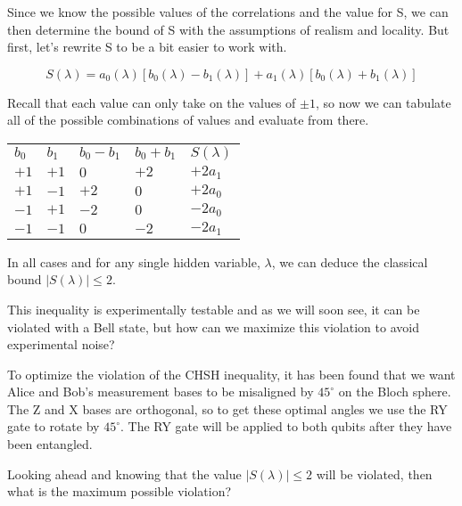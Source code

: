 \documentclass[12pt]{article}
\begin{document}
Since we know the possible values of the correlations and the value for S, we can then determine the bound of S with the assumptions of realism and locality. But first, let's rewrite S to be a bit easier to work with.

$$
S(\lambda)= a_0(\lambda) [b_0(\lambda) - b_1(\lambda)] + a_1(\lambda) [b_0(\lambda) + b_1(\lambda)]
$$

Recall that each value can only take on the values of $\pm1$, so now we can tabulate all of the possible combinations of values and evaluate from there.

\begin{center}
\begin{tabular}{
  |>{\centering\arraybackslash}p{1.5cm}  %
  |>{\centering\arraybackslash}p{1.5cm} 
  |>{\centering\arraybackslash}p{1.5cm} 
  |>{\centering\arraybackslash}p{1.5cm} 
  |>{\centering\arraybackslash}p{1.5cm}| 
}
 \hline
 \multicolumn{5}{|c|}{All possible permutations} \\
 \hline
 \(b_0\) & \(b_1\) & \(b_0 - b_1\) & \(b_0 + b_1\) & \(S(\lambda)\) \\
 \hline
 \(+1\)   &  \(+1\)    & \(0\) &  \(+2\) & \(+2a_1\) \\
 \(+1\)   &  \(-1\)    & \(+2\)&  \(0\) & \(+2a_0\) \\
 \(-1\)   &  \(+1\)    & \(-2\)&  \(0\) & \(-2a_0\) \\
 \(-1\)   &  \(-1\)    & \(0\) &  \(-2\) & \(-2a_1\) \\
 \hline
\end{tabular}
\end{center}

In all cases and for any single hidden variable, $\lambda$, we can deduce the classical bound $|S(\lambda)| \leq 2$. 

This inequality is experimentally testable and as we will soon see, it can be violated with a Bell state, but how can we maximize this violation to avoid experimental noise?

To optimize the violation of the CHSH inequality, it has been found that we want Alice and Bob's measurement bases to be misaligned by $45^\circ$ on the Bloch sphere. The Z and X bases are orthogonal, so to get these optimal angles we use the RY gate to rotate by $45^\circ$. The RY gate will be applied to both qubits after they have been entangled.

Looking ahead and knowing that the value $|S(\lambda)| \leq 2$ will be violated, then what is the maximum possible violation?
\end{document}
